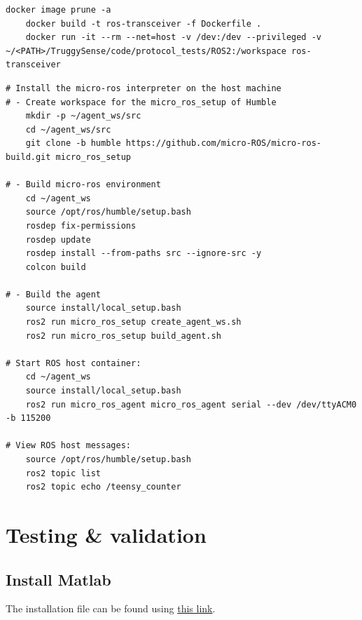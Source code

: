 \documentclass[ti,oneside,10pt]{uantwerpenreport}
\begin{document}
\begin{lstlisting}[style=cmd]
    docker image prune -a
    docker build -t ros-transceiver -f Dockerfile .
    docker run -it --rm --net=host -v /dev:/dev --privileged -v ~/<PATH>/TruggySense/code/protocol_tests/ROS2:/workspace ros-transceiver
\end{lstlisting}

\begin{lstlisting}[style=cmd]
# Install the micro-ros interpreter on the host machine
# - Create workspace for the micro_ros_setup of Humble
    mkdir -p ~/agent_ws/src
    cd ~/agent_ws/src
    git clone -b humble https://github.com/micro-ROS/micro-ros-build.git micro_ros_setup

# - Build micro-ros environment
    cd ~/agent_ws
    source /opt/ros/humble/setup.bash
    rosdep fix-permissions
    rosdep update
    rosdep install --from-paths src --ignore-src -y
    colcon build

# - Build the agent
    source install/local_setup.bash
    ros2 run micro_ros_setup create_agent_ws.sh
    ros2 run micro_ros_setup build_agent.sh

# Start ROS host container:
    cd ~/agent_ws
    source install/local_setup.bash
    ros2 run micro_ros_agent micro_ros_agent serial --dev /dev/ttyACM0 -b 115200

# View ROS host messages:
    source /opt/ros/humble/setup.bash
    ros2 topic list
    ros2 topic echo /teensy_counter
\end{lstlisting}

%



\chapter{Testing \& validation}     %
\section{Install Matlab}
The installation file can be found using \href{https://nl.mathworks.com/downloads/}{this link}.
\end{document}
